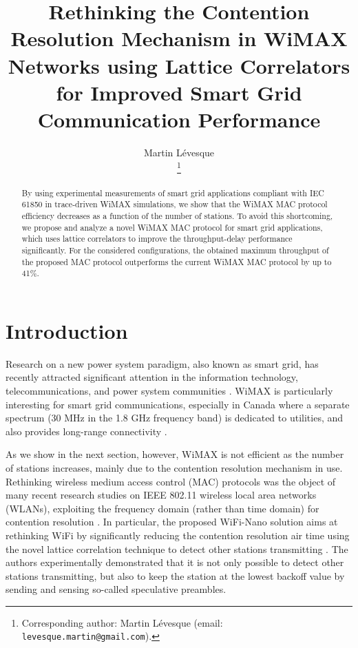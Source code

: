 \documentclass[journal,10pt,draftclsnofoot,onecolumn]{IEEEtran}
\begin{document}
\title{Rethinking the Contention Resolution Mechanism in WiMAX Networks using Lattice Correlators for Improved Smart Grid Communication Performance
}

\author{Martin L\'evesque


\thanks{Corresponding author: Martin L\'evesque (email: \texttt{levesque.martin@gmail.com}).}
}




\IEEEaftertitletext{\vspace*{-.7cm}
}

\maketitle
\begin{abstract}
By using experimental measurements of smart grid applications compliant with IEC 61850 in trace-driven WiMAX simulations, we show that the WiMAX MAC protocol efficiency decreases as a function of the number of stations. To avoid this shortcoming, we propose and analyze a novel WiMAX MAC protocol for smart grid applications, which uses lattice correlators to improve the throughput-delay performance significantly. For the considered configurations, the obtained maximum throughput of the proposed MAC protocol outperforms the current WiMAX MAC protocol by up to 41\%.
\end{abstract}
\vspace{-.25cm}

\section{Introduction}
Research on a new power system paradigm, also known as smart grid, has recently attracted significant attention in the information technology, telecommunications, and power system communities \cite{6157575}. WiMAX is particularly interesting for smart grid communications, especially in Canada where a separate spectrum (30 MHz in the 1.8 GHz frequency band) is dedicated to utilities, and also provides long-range connectivity \cite{lteSG}. 

As we show in the next section, however, WiMAX is not efficient as the number of stations increases, mainly due to the contention resolution mechanism in use. Rethinking wireless medium access control (MAC) protocols was the object of many recent research studies on IEEE 802.11 wireless local area networks (WLANs), exploiting the frequency domain (rather than time domain) for contention resolution \cite{6195796}. In particular, the proposed WiFi-Nano solution aims at rethinking WiFi by significantly reducing the contention resolution air time using the novel lattice correlation technique to detect other stations transmitting \cite{wifiNano}. The authors experimentally demonstrated that it is not only possible to detect other stations transmitting, but also to keep the station at the lowest backoff value by sending and sensing so-called speculative preambles. 
\end{document}
